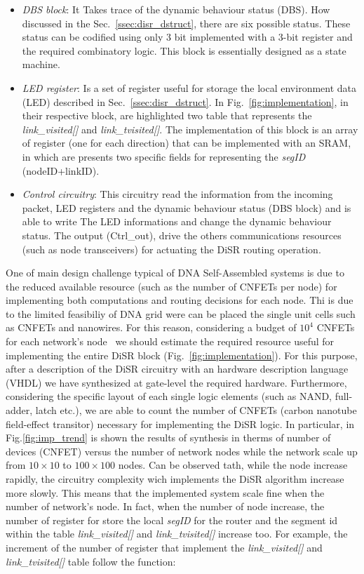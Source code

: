\begin{itemize}
\item \emph{DBS block}: It Takes trace of the dynamic behaviour status (DBS). 
      How discussed in the Sec.~\ref{ssec:disr_dstruct}, there are six possible status. 
      These status can be codified using only 3 bit implemented with a 3-bit register 
      and the required combinatory logic. This block is essentially designed as a state machine.
\item \emph{LED register}: Is a set of register useful for storage the local environment data (LED)
      described in Sec.~\ref{ssec:disr_dstruct}. In Fig.~\ref{fig:implementation}, in their 
      respective block, are highlighted two table that represents the \emph{link\_visited[]} 
      and \emph{link\_tvisited[]}. The implementation of this block is an array of register 
      (one for each direction) that can be implemented with an SRAM, in which are presents two 
      specific fields  for representing the \emph{segID} (nodeID+linkID). 
\item \emph{Control circuitry}: This circuitry read the information from the incoming packet, 
      LED registers and the dynamic behaviour status (DBS block) and is able to write The LED
      informations and change the dynamic behaviour status. The output (Ctrl\_out), drive 
      the others communications resources (such as node transceivers) for actuating the DiSR 
      routing operation.
\end{itemize}

One of main design challenge typical of DNA Self-Assembled systems is due to the
reduced available resource (such as the number of CNFETs per node) for implementing both 
computations and routing decisions for each node. Thi is due to the limited feasibiliy
of DNA grid were can be placed the single unit cells such as CNFETs and nanowires.
For this reason, considering a budget of $10^4$ CNFETs for each network's node~\cite{liu_jetcs}
we should estimate the required resource useful for implementing the entire DiSR block 
(Fig.~\ref{fig:implementation}). For this purpose, after a description of the DiSR circuitry 
with an hardware description language (VHDL) we have synthesized at gate-level the required 
hardware. Furthermore, considering the specific layout of each single logic elements 
(such as NAND, full-adder, latch etc.), we are able to count the number of CNFETs 
(carbon nanotube field-effect transitor) necessary for implementing the DiSR logic. 
In particular, in Fig.\ref{fig:imp_trend} is shown the results of synthesis in therms 
of number of devices (CNFET) versus the number of network nodes while the network scale 
up from $10\times10$ to $100\times100$ nodes. Can be observed tath, while the node increase 
rapidly, the circuitry complexity wich implements the DiSR algorithm increase more slowly. 
This means that the implemented system scale fine when the number of network's node. 
In fact, when the number of node increase, the number of register for store the local 
\emph{segID} for the router and the segment id within the table \emph{link\_visited[]} 
and \emph{link\_tvisited[]} increase too. For example, the increment of the number of 
register that implement the \emph{link\_visited[]} and \emph{link\_tvisited[]} table 
follow the function:

